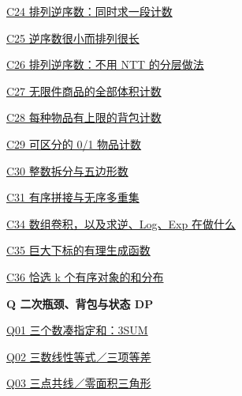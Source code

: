 \documentclass[10pt,a4paper]{article}
\begin{document}
\noindent\hyperref[C24]{C24 排列逆序数：同时求一段计数\nobreak\hfill\pageref*{C24}}\par\vspace{1.5pt}
\noindent\hyperref[C25]{C25 逆序数很小而排列很长\nobreak\hfill\pageref*{C25}}\par\vspace{1.5pt}
\noindent\hyperref[C26]{C26 排列逆序数：不用 NTT 的分层做法\nobreak\hfill\pageref*{C26}}\par\vspace{1.5pt}
\noindent\hyperref[C27]{C27 无限件商品的全部体积计数\nobreak\hfill\pageref*{C27}}\par\vspace{1.5pt}
\noindent\hyperref[C28]{C28 每种物品有上限的背包计数\nobreak\hfill\pageref*{C28}}\par\vspace{1.5pt}
\noindent\hyperref[C29]{C29 可区分的 0/1 物品计数\nobreak\hfill\pageref*{C29}}\par\vspace{1.5pt}
\noindent\hyperref[C30]{C30 整数拆分与五边形数\nobreak\hfill\pageref*{C30}}\par\vspace{1.5pt}
\noindent\hyperref[C31]{C31 有序拼接与无序多重集\nobreak\hfill\pageref*{C31}}\par\vspace{1.5pt}
\noindent\hyperref[C34]{C34 数组卷积，以及求逆、Log、Exp 在做什么\nobreak\hfill\pageref*{C34}}\par\vspace{1.5pt}
\noindent\hyperref[C35]{C35 巨大下标的有理生成函数\nobreak\hfill\pageref*{C35}}\par\vspace{1.5pt}
\noindent\hyperref[C36]{C36 恰选 k 个有序对象的和分布\nobreak\hfill\pageref*{C36}}\par\vspace{1.5pt}
\par\vspace{6pt}\textbf{Q 二次瓶颈、背包与状态 DP}\par\vspace{3pt}
\noindent\hyperref[Q01]{Q01 三个数凑指定和：3SUM\nobreak\hfill\pageref*{Q01}}\par\vspace{1.5pt}
\noindent\hyperref[Q02]{Q02 三数线性等式／三项等差\nobreak\hfill\pageref*{Q02}}\par\vspace{1.5pt}
\noindent\hyperref[Q03]{Q03 三点共线／零面积三角形\nobreak\hfill\pageref*{Q03}}\par\vspace{1.5pt}
\end{document}
